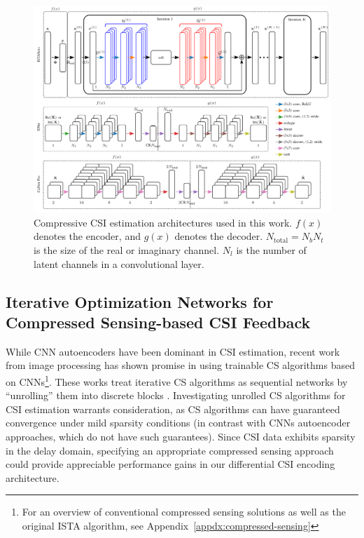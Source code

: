 \begin{figure}[!hbtp]
    \centering
    \includegraphics[width=\linewidth]{images/arch-comparison.png}
    \caption{Compressive CSI estimation architectures used in this work. $f(x)$ denotes the encoder, and $g(x)$ denotes the decoder. $N_{\text{total}}=N_bN_t$ is the size of the real or imaginary channel. $N_l$ is the number of latent channels in a convolutional layer.}
    \label{fig:arch_compare}
\end{figure}

\subsection{Iterative Optimization Networks for Compressed Sensing-based CSI Feedback} \label{sec:iter-cs}

 
While CNN autoencoders have been dominant in CSI estimation, recent work from image processing has shown promise in using trainable CS algorithms based on CNNs\footnote{For an overview of conventional compressed sensing solutions as well as the original ISTA algorithm, see Appendix~\ref{appdx:compressed-sensing}}. These works treat iterative CS algorithms as sequential networks by ``unrolling'' them into discrete blocks \cite{ref:yang2016deep, ref:zhang2018ista}. Investigating unrolled CS algorithms for CSI estimation warrants consideration, as CS algorithms can have guaranteed convergence under mild sparsity conditions (in contrast with CNNs autoencoder approaches, which do not have such guarantees). Since CSI data exhibits sparsity in the delay domain, specifying an appropriate compressed sensing approach could provide appreciable performance gains in our differential CSI encoding architecture. 

